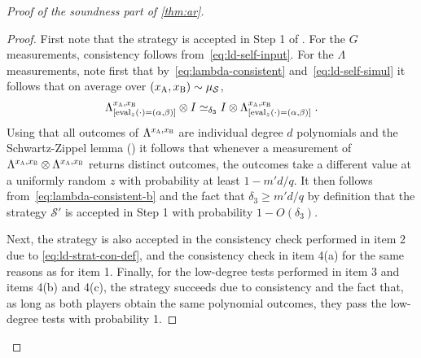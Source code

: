 \documentclass[11pt]{article}
\theoremstyle{definition}
\newcommand{\ot}{\otimes}
\newcommand{\sampler}{\mathcal{S}}
\newcommand{\strategy}{\mathscr{S}}
\newcommand{\labelstyle}[1]{\ensuremath{\textsc{#1}}\xspace}
\newcommand{\alice}{\labelstyle{A}}
\newcommand{\bob}{\labelstyle{B}}
\newcommand{\eval}{\mathrm{eval}}
\begin{document}
\begin{proof}[Proof of the soundness part of \cref{thm:ar}]
\begin{proof}
  First note that the strategy is accepted in Step 1 of .
  For the $G$ measurements, consistency follows from~\eqref{eq:ld-self-input}.
  For the $\Lambda$ measurements, note first that
  by~\eqref{eq:lambda-consistent} and~\eqref{eq:ld-self-simul} it follows that
  on average over $(x_\alice,x_\bob)\sim \mu_\sampler$,
  \begin{equation}
    \Lambda^{{x}_\alice, {x}_\bob}_{[\eval_{z}(\cdot) = ( \alpha, \beta)]} \ot I
    \simeq_{\delta_3} I \ot \Lambda^{{x}_\alice, {x}_\bob}_{[\eval_{z}(\cdot)
      = ( \alpha, \beta)]} \;.
    \label{eq:lambda-consistent-b}
  \end{equation}
	Using that all outcomes of $\Lambda^{{x}_\alice, {x}_\bob}$ are individual degree $d$
  polynomials and the Schwartz-Zippel lemma () it
  follows that whenever a measurement of $\Lambda^{{x}_\alice, {x}_\bob}\ot
  \Lambda^{{x}_\alice, {x}_\bob}$ returns distinct outcomes, the outcomes take a
  different value at a uniformly random $z$ with probability at least $1-m'd/q$.
  It then follows from~\eqref{eq:lambda-consistent-b} and the fact that
  $\delta_3 \geq m'd/q$ by definition that the strategy $\strategy'$ is accepted
  in Step 1 with probability $1 - O(\delta_3)$.

  Next, the strategy is also accepted in the consistency check performed in item
  2 due to \eqref{eq:ld-strat-con-def}, and the consistency check in item 4(a)
  for the same reasons as for item 1.
  Finally, for the low-degree tests performed in item 3 and items 4(b) and 4(c),
  the strategy succeeds due to consistency and the fact that, as long as both
  players obtain the same polynomial outcomes, they pass the low-degree tests
  with probability 1.


\end{proof}
\end{proof}
\end{document}
